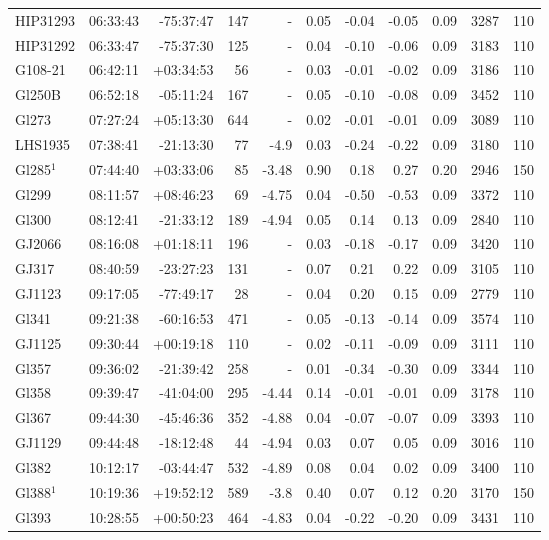\documentclass[referee]{aa}
\begin{document}
{\begin{longtable}{l r r r r r r r r r r}
HIP31293 & 06:33:43 & -75:37:47 & 147 &    - & 0.05 & -0.04 & -0.05 & 0.09 & 3287 &  110 \\
HIP31292 & 06:33:47 & -75:37:30 & 125 &    - & 0.04 & -0.10 & -0.06 & 0.09 & 3183 &  110 \\
G108-21 & 06:42:11 & +03:34:53 & 56 &    - & 0.03 & -0.01 & -0.02 & 0.09 & 3186 &  110 \\
Gl250B & 06:52:18 & -05:11:24 & 167 &    - & 0.05 & -0.10 & -0.08 & 0.09 & 3452 &  110 \\
Gl273 & 07:27:24 & +05:13:30 & 644 &    - & 0.02 & -0.01 & -0.01 & 0.09 & 3089 &  110 \\
LHS1935 & 07:38:41 & -21:13:30 & 77 & -4.9 & 0.03 & -0.24 & -0.22 & 0.09 & 3180 &  110 \\
Gl285$^1$ & 07:44:40 & +03:33:06 & 85 & -3.48 & 0.90 & 0.18 & 0.27 & 0.20 & 2946 &  150 \\
Gl299 & 08:11:57 & +08:46:23 & 69 & -4.75 & 0.04 & -0.50 & -0.53 & 0.09 & 3372 &  110 \\
Gl300 & 08:12:41 & -21:33:12 & 189 & -4.94 & 0.05 & 0.14 & 0.13 & 0.09 & 2840 &  110 \\
GJ2066 & 08:16:08 & +01:18:11 & 196 &    - & 0.03 & -0.18 & -0.17 & 0.09 & 3420 &  110 \\
GJ317 & 08:40:59 & -23:27:23 & 131 &    - & 0.07 & 0.21 & 0.22 & 0.09 & 3105 &  110 \\
GJ1123 & 09:17:05 & -77:49:17 & 28 &    - & 0.04 & 0.20 & 0.15 & 0.09 & 2779 &  110 \\
Gl341 & 09:21:38 & -60:16:53 & 471 &    - & 0.05 & -0.13 & -0.14 & 0.09 & 3574 &  110 \\
GJ1125 & 09:30:44 & +00:19:18 & 110 &    - & 0.02 & -0.11 & -0.09 & 0.09 & 3111 &  110 \\
Gl357 & 09:36:02 & -21:39:42 & 258 &    - & 0.01 & -0.34 & -0.30 & 0.09 & 3344 &  110 \\
Gl358 & 09:39:47 & -41:04:00 & 295 & -4.44 & 0.14 & -0.01 & -0.01 & 0.09 & 3178 &  110 \\
Gl367 & 09:44:30 & -45:46:36 & 352 & -4.88 & 0.04 & -0.07 & -0.07 & 0.09 & 3393 &  110 \\
GJ1129 & 09:44:48 & -18:12:48 & 44 & -4.94 & 0.03 & 0.07 & 0.05 & 0.09 & 3016 &  110 \\
Gl382 & 10:12:17 & -03:44:47 & 532 & -4.89 & 0.08 & 0.04 & 0.02 & 0.09 & 3400 &  110 \\
Gl388$^1$ & 10:19:36 & +19:52:12 & 589 & -3.8 & 0.40 & 0.07 & 0.12 & 0.20 & 3170 &  150 \\
Gl393 & 10:28:55 & +00:50:23 & 464 & -4.83 & 0.04 & -0.22 & -0.20 & 0.09 & 3431 &  110 \\

\end{longtable}}
\end{document}
